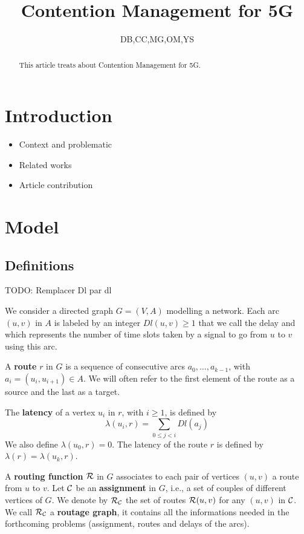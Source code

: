 \documentclass[a4paper,10pt]{article}
\title{Contention Management for 5G}
\author{DB,CC,MG,OM,YS}
\newcommand{\todo}[1]{{\color{red} TODO: {#1}}}
\begin{document}
\maketitle

\begin{abstract}
This article treats about Contention Management for 5G.
\end{abstract}

\section{Introduction}
  \begin{itemize}
    \item Context and problematic
    \item Related works
    \item Article contribution
  \end{itemize}

  

\section{Model}

  \subsection{Definitions}
  
  \todo{Remplacer Dl par dl}
  
	We consider a directed graph $G=(V,A)$ modelling a network. Each arc  $(u,v)$ in $A$ is labeled by an integer $Dl(u,v) \geq 1$ that we call the delay and
	which represents the number of time slots taken by a signal to go from $u$ to $v$ using this arc. 
	
      A {\bf route} $r$ in $G$ is a sequence of consecutive arcs $a_0, \ldots , a_{k-1}$, with $a_i=(u_i,u_{i+1}) \in A$. 
      We will often refer to the first element of the route as a source and the last as a target.
      
      The {\bf latency} of a vertex $u_i$ in $r$, with $i \geq 1$, is defined by $$\lambda(u_i,r)= \sum\limits_{0 \leq j <i} Dl(a_j)$$ We also define $\lambda(u_0,r)=0$.
      The latency of the route $r$ is defined by $\lambda (r)= \lambda (u_k,r)$.
      

      A {\bf routing function} $\cal R$ in $G$ associates to each pair of vertices $(u,v)$ a route from $u$ to $v$. Let $\cal C$ be an {\bf assignment} in $G$, i.e., a set of couples of different vertices of $G$. We denote by $\cal R_{\cal C}$ the set of routes ${\cal R}(u,v)$ for any $(u,v)$ in $\cal C$. We call $\cal R_{\cal C}$ a {\bf routage graph}, it contains all the informations needed in the forthcoming problems (assignment, routes and delays of the arcs). 
      
\end{document}
